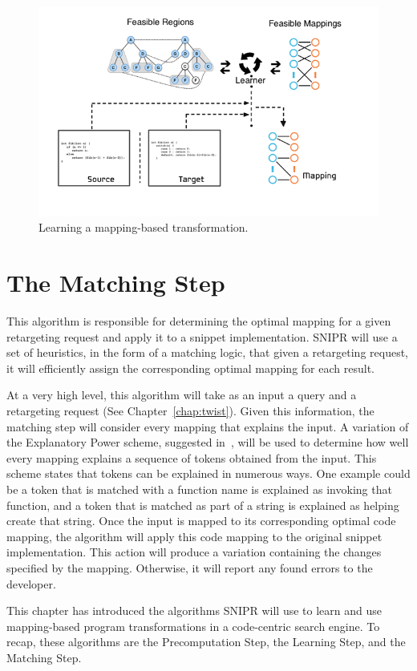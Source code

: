 \begin{figure}[!ht]
    \centering
    \includegraphics[width=\textwidth]{images/mappinggeneration}
    \caption{Learning a mapping-based transformation.}
    \label{fig:mappinggeneration}
\end{figure}

\section{The Matching Step}
\label{sec:matching}

This algorithm is responsible for determining the optimal mapping for a given retargeting request and apply it to a snippet implementation. SNIPR will use a set of heuristics, in the form of a matching logic, that given a retargeting request, it will efficiently assign the corresponding optimal mapping for each result. 

At a very high level, this algorithm will take as an input a query and a retargeting request (See Chapter~\ref{chap:twist}). Given this information, the matching step will consider every mapping that explains the input. A variation of the Explanatory Power scheme, suggested in~\cite{Little:2008hr}, will be used to determine how well every mapping explains a sequence of tokens obtained from the input. This scheme states that tokens can be explained in numerous ways. One example could be a token that is matched with a function name is explained as invoking that function, and a token that is matched as part of a string is explained as helping create that string. Once the input is mapped to its corresponding optimal code mapping, the algorithm will apply this code mapping to the original snippet implementation. This action will produce a variation containing the changes specified by the mapping. Otherwise, it will report any found errors to the developer. 

This chapter has introduced the algorithms SNIPR will use to learn and use mapping-based program transformations in a code-centric search engine. To recap, these algorithms are the Precomputation Step, the Learning Step, and the Matching Step.
